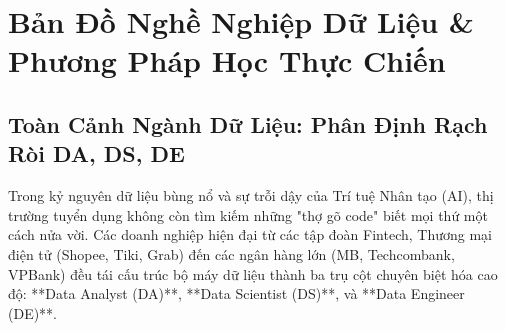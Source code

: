 \chapter{Bản Đồ Nghề Nghiệp Dữ Liệu \& Phương Pháp Học Thực Chiến}

\section{Toàn Cảnh Ngành Dữ Liệu: Phân Định Rạch Ròi DA, DS, DE}

Trong kỷ nguyên dữ liệu bùng nổ và sự trỗi dậy của Trí tuệ Nhân tạo (AI), thị trường tuyển dụng không còn tìm kiếm những "thợ gõ code" biết mọi thứ một cách nửa vời. Các doanh nghiệp hiện đại từ các tập đoàn Fintech, Thương mại điện tử (Shopee, Tiki, Grab) đến các ngân hàng lớn (MB, Techcombank, VPBank) đều tái cấu trúc bộ máy dữ liệu thành ba trụ cột chuyên biệt hóa cao độ: **Data Analyst (DA)**, **Data Scientist (DS)**, và **Data Engineer (DE)**.

